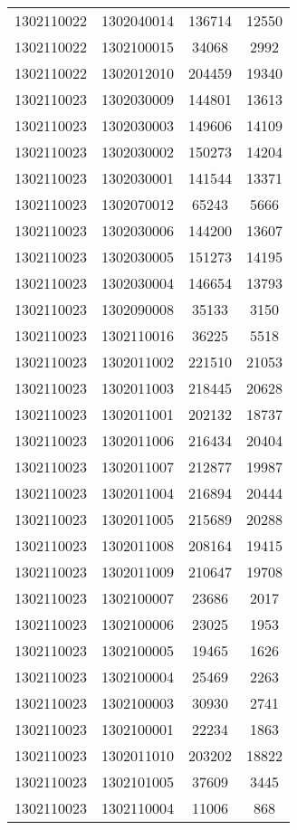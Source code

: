 \begin{longtable}[h]{llcc}
		1302110022 & 1302040014 & 136714 & 12550\\
		1302110022 & 1302100015 & 34068 & 2992\\
		1302110022 & 1302012010 & 204459 & 19340\\
		1302110023 & 1302030009 & 144801 & 13613\\
		1302110023 & 1302030003 & 149606 & 14109\\
		1302110023 & 1302030002 & 150273 & 14204\\
		1302110023 & 1302030001 & 141544 & 13371\\
		1302110023 & 1302070012 & 65243 & 5666\\
		1302110023 & 1302030006 & 144200 & 13607\\
		1302110023 & 1302030005 & 151273 & 14195\\
		1302110023 & 1302030004 & 146654 & 13793\\
		1302110023 & 1302090008 & 35133 & 3150\\
		1302110023 & 1302110016 & 36225 & 5518\\
		1302110023 & 1302011002 & 221510 & 21053\\
		1302110023 & 1302011003 & 218445 & 20628\\
		1302110023 & 1302011001 & 202132 & 18737\\
		1302110023 & 1302011006 & 216434 & 20404\\
		1302110023 & 1302011007 & 212877 & 19987\\
		1302110023 & 1302011004 & 216894 & 20444\\
		1302110023 & 1302011005 & 215689 & 20288\\
		1302110023 & 1302011008 & 208164 & 19415\\
		1302110023 & 1302011009 & 210647 & 19708\\
		1302110023 & 1302100007 & 23686 & 2017\\
		1302110023 & 1302100006 & 23025 & 1953\\
		1302110023 & 1302100005 & 19465 & 1626\\
		1302110023 & 1302100004 & 25469 & 2263\\
		1302110023 & 1302100003 & 30930 & 2741\\
		1302110023 & 1302100001 & 22234 & 1863\\
		1302110023 & 1302011010 & 203202 & 18822\\
		1302110023 & 1302101005 & 37609 & 3445\\
		1302110023 & 1302110004 & 11006 & 868\\

\end{longtable}
